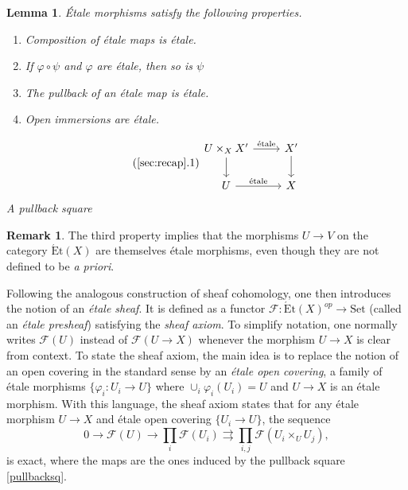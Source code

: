\documentclass{article}
\newcommand{\Set}{\mathrm{Set}}
\newcommand{\Et}{\acute{\mathrm{E}}\mathrm{t}}
\theoremstyle{plain}
\newtheorem{lemma}[theorem]{Lemma}
\theoremstyle{definition}
\newtheorem{remark}[theorem]{Remark}
\begin{document}
    \begin{lemma}\label{lem:etaleproperties}
        \'{E}tale morphisms satisfy the following properties.
        \vspace{0.4cm}

        \begin{minipage}{0.45\textwidth}
            \begin{enumerate}[(1)]
                \item Composition of \'{e}tale maps is \'{e}tale.
                \item If $\varphi\circ\psi$ and $\varphi$ are \'{e}tale, then so is $\psi$
                \item The pullback of an \'{e}tale map is \'{e}tale.
                \item Open immersions are \'{e}tale.
            \end{enumerate}       
        \end{minipage}
        \begin{minipage}{0.45\textwidth}
            \centering
            \begin{equation}\tag{\ref{sec:recap}.1}\label{pullbacksq}
                \begin{tikzcd}
                    U\times_X X' \arrow[r,"\text{\'{e}tale}"] \arrow[d,""] & X' \arrow[d,""] \\
                    U \arrow[r,"\text{\'{e}tale}"] & X
                \end{tikzcd}
            \end{equation}
            A pullback square
        \end{minipage}        
    \end{lemma}

    \begin{remark}
        The third property implies that the morphisms $U\to V$ on the category $\Et(X)$ are themselves \'{e}tale morphisms, even though they are not defined to be \textit{a priori}.
    \end{remark}
    
    

    Following the analogous construction of sheaf cohomology, one then introduces the notion of an \textit{\'{e}tale sheaf}. It is defined as a functor $\mathcal{F}:\Et(X)^{op}\to\Set$ (called an \textit{\'{e}tale presheaf}) satisfying the \textit{sheaf axiom}. To simplify notation, one normally writes $\mathcal{F}(U)$ instead of $\mathcal{F}(U\to X)$ whenever the morphism $U\to X$ is clear from context. To state the sheaf axiom, the main idea is to replace the notion of an open covering in the standard sense by an \textit{\'{e}tale open covering}, a family of \'{e}tale morphisms $\{\varphi_i:U_i\to U\}$ where $\cup_i\varphi_i(U_i)=U$ and $U\to X$ is an \'{e}tale morphism. With this language, the sheaf axiom states that for any \'{e}tale morphism $U\to X$ and \'{e}tale open covering $\{U_i\to U\}$, the sequence
    $$0\longrightarrow \mathcal{F}(U)\longrightarrow\prod_i\mathcal{F}(U_i)\rightrightarrows\prod_{i,j}\mathcal{F}(U_i\times_U U_j),$$
    is exact, where the maps are the ones induced by the pullback square \eqref{pullbacksq}.
\end{document}
